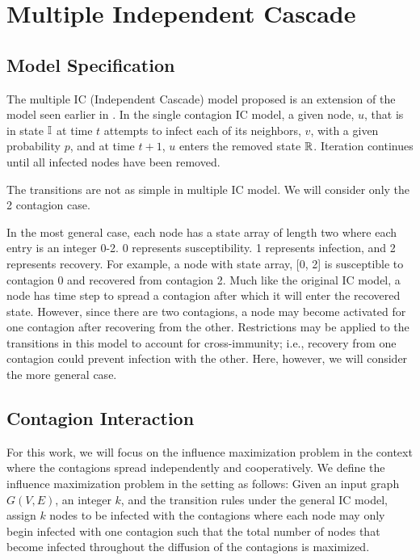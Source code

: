 \documentclass[11pt]{article}
\begin{document}
\section{Multiple Independent Cascade}

\subsection{Model Specification}

The multiple IC (Independent Cascade) model proposed is an extension of the model seen earlier in \cite{KKT_Greedy}. In the single contagion IC model, a given node, $u$, that is in state $\mbox{$\mathbb{I}$}{}$ at time $t$ attempts to infect each of its neighbors, $v$, with a given probability $p$, and at time $t+1$, $u$ enters the removed state $\mbox{$\mathbb{R}$}{}$. Iteration continues until all infected nodes have been removed. 

The transitions are not as simple in multiple IC model. We will consider only the 2 contagion case.

In the most general case, each node has a state array of length two where each entry is an integer 0-2. 0 represents susceptibility. 1 represents infection, and 2 represents recovery. For example, a node with state array, [0, 2] is susceptible to contagion 0 and recovered from contagion 2. Much like the original IC model, a node has time step to spread a contagion after which it will enter the recovered state. However, since there are two contagions, a node may become activated for one contagion after recovering from the other. Restrictions may be applied to the transitions in this model to account for cross-immunity; i.e., recovery from one contagion could prevent infection with the other. Here, however, we will consider the more general case. 

\subsection{Contagion Interaction}

For this work, we will focus on the influence maximization problem in the context where the contagions spread independently and cooperatively. We define the influence maximization problem in the setting as follows: Given an input graph $G(V,E)$, an integer $k$, and the transition rules under the general IC model, assign $k$ nodes to be infected with the contagions where each node may only begin infected with one contagion such that the total number of nodes that become infected throughout the diffusion of the contagions is maximized. 
\end{document}
